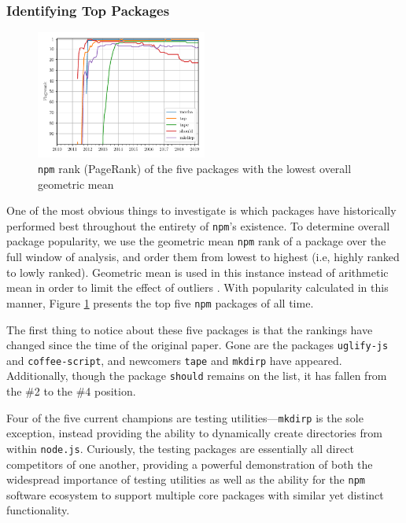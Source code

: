 \documentclass[10pt,conference]{IEEEtran}
\def\code#1{\texttt{#1}}
\begin{document}
\subsubsection{Identifying Top Packages}

\begin{figure}
  \includegraphics[width=0.5\textwidth]{figures/geo_mean_highest_pagerank.pdf}
  \caption{\code{npm} rank (PageRank) of the five packages with the lowest overall geometric mean}
  \label{topFive}
\end{figure}

One of the most obvious things to investigate is which packages
have historically performed best throughout the entirety of 
\code{npm}'s existence. To determine overall package popularity,
we use the geometric mean \code{npm} rank of a package over the full 
window of analysis, and order them from lowest to highest (i.e,
highly ranked to lowly ranked). Geometric mean is used in this instance
instead of arithmetic mean in order to limit the effect of outliers \cite{Wittern:2016}.
With popularity calculated in this manner, Figure \ref{topFive} presents 
the top five \code{npm} packages of all time.

The first thing to notice about these five packages is that the rankings
have changed since the time of the original paper. Gone are the packages
\code{uglify-js} and \code{coffee-script}, and newcomers \code{tape} and \code{mkdirp}
have appeared. Additionally, though the package \code{should} remains on the list,
it has fallen from the \#2 to the \#4 position. 

Four of the five current champions are testing utilities---\code{mkdirp} is the sole exception, instead providing the ability to dynamically
create directories from within \code{node.js}. Curiously, the testing packages
are essentially all direct competitors of one another, providing a powerful 
demonstration of both the widespread importance of testing utilities as well as
the ability for the \code{npm} software ecosystem to support multiple core packages with
similar yet distinct functionality.
\end{document}

